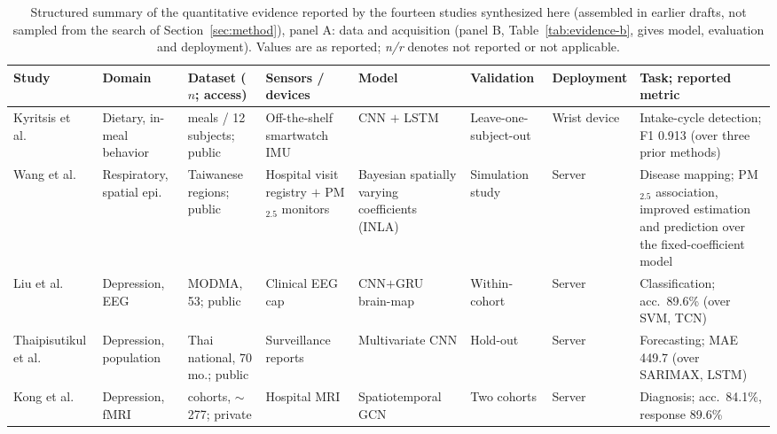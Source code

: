 \documentclass[journal]{IEEEtran}
\newif\ifsubmission
\begin{document}
\begin{table}[t]
\centering
\caption{Structured summary of the quantitative evidence reported by the fourteen studies synthesized here (assembled in earlier drafts, not sampled from the search of Section~\ref{sec:method})\ifsubmission\else, panel A: data and acquisition (panel B, Table~\ref{tab:evidence-b}, gives model, evaluation and deployment)\fi. Values are as reported; \emph{n/r} denotes not reported or not applicable.}
\label{tab:evidence}
\ifsubmission
\scriptsize
\setlength{\tabcolsep}{2.5pt}
\renewcommand{\arraystretch}{1.08}
\begin{tabularx}{\textwidth}{>{\raggedright\arraybackslash}p{1.9cm} >{\raggedright\arraybackslash}p{1.6cm} >{\raggedright\arraybackslash}p{2.2cm} >{\raggedright\arraybackslash}p{1.6cm} >{\raggedright\arraybackslash}p{1.9cm} >{\raggedright\arraybackslash}p{1.4cm} >{\raggedright\arraybackslash}p{1.7cm} >{\raggedright\arraybackslash}X}
\toprule
\textbf{Study} & \textbf{Domain} & \textbf{Dataset ($n$; access)} & \textbf{Sensors / devices} & \textbf{Model} & \textbf{Validation} & \textbf{Deployment} & \textbf{Task; reported metric} \\
\midrule
Kyritsis et al.~\cite{Kyritsis2019EatingBehavior} & Dietary, in-meal behavior & 21 meals / 12 subjects; public & Off-the-shelf smartwatch IMU & CNN $+$ LSTM & Leave-one-subject-out & Wrist device & Intake-cycle detection; F1 0.913 (over three prior methods) \\
\addlinespace[1pt]
Wang et al.~\cite{wang2024respiratoryDiseaseMapping} & Respiratory, spatial epi. & 328 Taiwanese regions; public & Hospital visit registry $+$ PM$_{2.5}$ monitors & Bayesian spatially varying coefficients (INLA) & Simulation study & Server & Disease mapping; PM$_{2.5}$ association, improved estimation and prediction over the fixed-coefficient model \\
\addlinespace[1pt]
Liu et al.~\cite{2} & Depression, EEG & MODMA, 53; public & Clinical EEG cap & CNN$+$GRU brain-map & Within-cohort & Server & Classification; acc.\ 89.6\% (over SVM, TCN) \\
\addlinespace[1pt]
Thaipisutikul et al.~\cite{3} & Depression, population & Thai national, 70 mo.; public & Surveillance reports & Multivariate CNN & Hold-out & Server & Forecasting; MAE 449.7 (over SARIMAX, LSTM) \\
\addlinespace[1pt]
Kong et al.~\cite{4} & Depression, fMRI & 2 cohorts, $\sim$277; private & Hospital MRI & Spatiotemporal GCN & Two cohorts & Server & Diagnosis; acc.\ 84.1\%, response 89.6\% \\

\end{tabularx}
\end{table}
\end{document}

